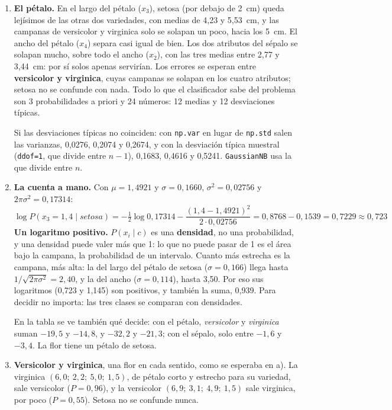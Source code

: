 \documentclass{article}
\begin{document}
\begin{enumerate}
    \item[a)] \textbf{El pétalo.} En el largo del pétalo ($x_3$), setosa (por debajo de 2~cm) queda lejísimos de las otras dos variedades, con medias de 4,23 y 5,53~cm, y las campanas de versicolor y virginica solo se solapan un poco, hacia los 5~cm. El ancho del pétalo ($x_4$) separa casi igual de bien. Los dos atributos del sépalo se solapan mucho, sobre todo el ancho ($x_2$), con las tres medias entre 2,77 y 3,44~cm: por sí solos apenas servirían. Los errores se esperan entre \textbf{versicolor y virginica}, cuyas campanas se solapan en los cuatro atributos; setosa no se confunde con nada. Todo lo que el clasificador sabe del problema son 3 probabilidades a priori y 24 números: 12 medias y 12 desviaciones típicas.

    Si las desviaciones típicas no coinciden: con \texttt{np.var} en lugar de \texttt{np.std} salen las varianzas, 0,0276, 0,2074 y 0,2674, y con la desviación típica muestral (\texttt{ddof=1}, que divide entre $n - 1$), 0,1683, 0,4616 y 0,5241. \texttt{GaussianNB} usa la que divide entre $n$.

    \item[b)] \textbf{La cuenta a mano.} Con $\mu = 1{,}4921$ y $\sigma = 0{,}1660$, $\sigma^2 = 0{,}02756$ y $2\pi\sigma^2 = 0{,}17314$:
    \[
    \log P(x_3 = 1{,}4 \mid \textit{setosa}) = -\tfrac{1}{2}\log 0{,}17314 - \frac{(1{,}4 - 1{,}4921)^2}{2 \cdot 0{,}02756} = 0{,}8768 - 0{,}1539 = 0{,}7229 \approx 0{,}723
    \]
    \textbf{Un logaritmo positivo.} $P(x_i \mid c)$ es una \textbf{densidad}, no una probabilidad, y una densidad puede valer más que 1: lo que no puede pasar de 1 es el área bajo la campana, la probabilidad de un intervalo. Cuanto más estrecha es la campana, más alta: la del largo del pétalo de setosa ($\sigma = 0{,}166$) llega hasta $1/\sqrt{2\pi\sigma^2} = 2{,}40$, y la del ancho ($\sigma = 0{,}114$), hasta 3,50. Por eso sus logaritmos (0,723 y 1,145) son positivos, y también la suma, 0,939. Para decidir no importa: las tres clases se comparan con densidades.

    En la tabla se ve también qué decide: con el pétalo, \textit{versicolor} y \textit{virginica} suman $-19{,}5$ y $-14{,}8$, y $-32{,}2$ y $-21{,}3$; con el sépalo, solo entre $-1{,}6$ y $-3{,}4$. La flor tiene un pétalo de setosa.

    \item[c)] \textbf{Versicolor y virginica}, una flor en cada sentido, como se esperaba en a). La virginica $(6{,}0;\ 2{,}2;\ 5{,}0;\ 1{,}5)$, de pétalo corto y estrecho para su variedad, sale versicolor ($P = 0{,}96$), y la versicolor $(6{,}9;\ 3{,}1;\ 4{,}9;\ 1{,}5)$ sale virginica, por poco ($P = 0{,}55$). Setosa no se confunde nunca.


\end{enumerate}
\end{document}
